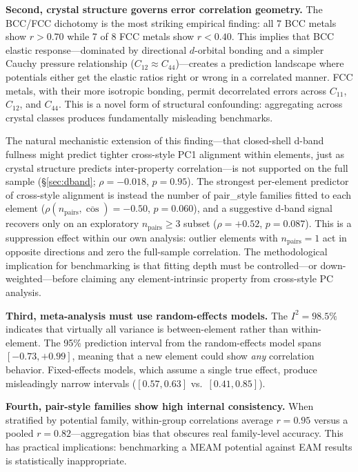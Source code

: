 \documentclass[twocolumn,10pt]{article}
\begin{document}
\textbf{Second, crystal structure governs error correlation geometry.} The BCC/FCC dichotomy is the most striking empirical finding: all 7 BCC metals show $r > 0.70$ while 7 of 8 FCC metals show $r < 0.40$. This implies that BCC elastic response---dominated by directional $d$-orbital bonding and a simpler Cauchy pressure relationship ($C_{12} \approx C_{44}$)---creates a prediction landscape where potentials either get the elastic ratios right or wrong in a correlated manner. FCC metals, with their more isotropic bonding, permit decorrelated errors across $C_{11}$, $C_{12}$, and $C_{44}$. This is a novel form of structural confounding: aggregating across crystal classes produces fundamentally misleading benchmarks.

The natural mechanistic extension of this finding---that closed-shell d-band fullness might predict tighter cross-style PC1 alignment within elements, just as crystal structure predicts inter-property correlation---is not supported on the full sample (\S\ref{sec:dband}; $\rho = -0.018$, $p = 0.95$). The strongest per-element predictor of cross-style alignment is instead the number of pair\_style families fitted to each element ($\rho(n_{\text{pairs}}, \overline{\cos}) = -0.50$, $p = 0.060$), and a suggestive d-band signal recovers only on an exploratory $n_{\text{pairs}} \geq 3$ subset ($\rho = +0.52$, $p = 0.087$). This is a suppression effect within our own analysis: outlier elements with $n_{\text{pairs}} = 1$ act in opposite directions and zero the full-sample correlation. The methodological implication for benchmarking is that fitting depth must be controlled---or down-weighted---before claiming any element-intrinsic property from cross-style PC analysis.

\textbf{Third, meta-analysis must use random-effects models.} The $I^2 = 98.5\%$ indicates that virtually all variance is between-element rather than within-element. The 95\% prediction interval from the random-effects model spans $[-0.73, +0.99]$, meaning that a new element could show \textit{any} correlation behavior. Fixed-effects models, which assume a single true effect, produce misleadingly narrow intervals ($[0.57, 0.63]$ vs.\ $[0.41, 0.85]$).

\textbf{Fourth, pair-style families show high internal consistency.} When stratified by potential family, within-group correlations average $r = 0.95$ versus a pooled $r = 0.82$---aggregation bias that obscures real family-level accuracy. This has practical implications: benchmarking a MEAM potential against EAM results is statistically inappropriate.
\end{document}
